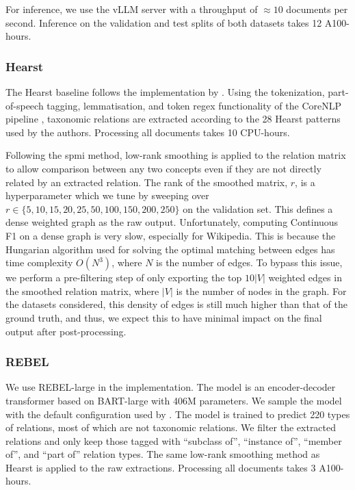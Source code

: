 For inference, we use the vLLM \cite{kwon2023efficient} server with a throughput of $\approx 10$ documents per second. Inference on the validation and test splits of both datasets takes 12 A100-hours.

\subsubsection{Hearst}

The Hearst baseline follows the implementation by \citet{roller2018hearst}. Using the tokenization, part-of-speech tagging, lemmatisation, and token regex functionality of the CoreNLP pipeline \cite{manning2014stanford}, taxonomic relations are extracted according to the 28 Hearst patterns used by the authors. Processing all documents takes 10 CPU-hours.

Following the spmi method, low-rank smoothing is applied to the relation matrix to allow comparison between any two concepts even if they are not directly related by an extracted relation. The rank of the smoothed matrix, $r$, is a hyperparameter which we tune by sweeping over $r \in \{5, 10, 15, 20, 25, 50, 100, 150, 200, 250\}$ on the validation set. This defines a dense weighted graph as the raw output. Unfortunately, computing Continuous F1 on a dense graph is very slow, especially for Wikipedia. This is because the Hungarian algorithm used for solving the optimal matching between edges has time complexity $O(N^3)$, where $N$ is the number of edges. To bypass this issue, we perform a pre-filtering step of only exporting the top $10|V|$ weighted edges in the smoothed relation matrix, where $|V|$ is the number of nodes in the graph. For the datasets considered, this density of edges is still much higher than that of the ground truth, and thus, we expect this to have minimal impact on the final output after post-processing.

\subsubsection{REBEL}

We use REBEL-large \cite{cabot2021rebel} in the implementation. The model is an encoder-decoder transformer based on BART-large \cite{lewis2019bart} with 406M parameters. We sample the model with the default configuration used by \citet{cabot2021rebel}. The model is trained to predict 220 types of relations, most of which are not taxonomic relations. We filter the extracted relations and only keep those tagged with ``subclass of'', ``instance of'', ``member of'', and ``part of'' relation types. The same low-rank smoothing method as Hearst is applied to the raw extractions. Processing all documents takes 3 A100-hours.

